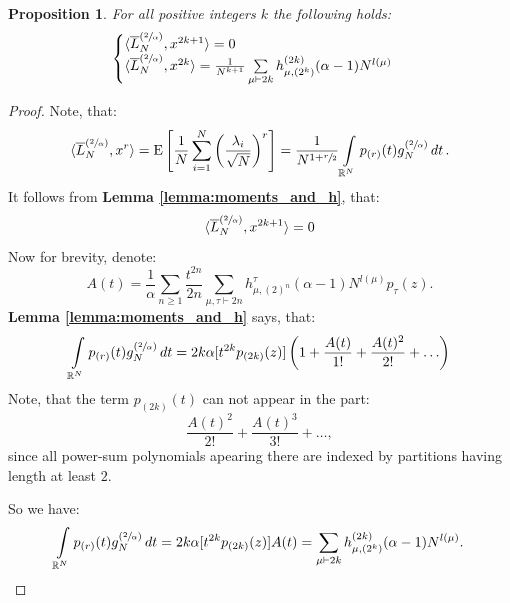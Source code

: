 \documentclass{article}
\newtheorem{proposition}{Proposition}
\newcommand{\E}{\mathrm{E}}
\begin{document}
\begin{proposition}\label{prop:moments_and_h}
    For all positive integers $k$ the following holds:
    \begin{equation}
        \begin{cases}
        \langle \overline{L}_{N}^{(\sfrac{2}{\alpha})}, x^{2k + 1} \rangle = 0 \\
        \langle \overline{L}_{N}^{(\sfrac{2}{\alpha})}, x^{2k} \rangle = \frac{1}{N^{k + 1}}\sum\limits_{\mu \vdash 2k}h_{\mu, (2^k)}^{(2k)}(\alpha - 1)N^{l(\mu)}
        \end{cases}
    \end{equation}
\end{proposition}
\begin{proof}
    Note, that:
    $$
        \langle \overline{L}_{N}^{(\sfrac{2}{\alpha})}, x^{r} \rangle = \E\left[\frac{1}{N}\sum\limits_{i = 1}^N\left(\frac{\lambda_i}{\sqrt{N}}\right)^r\right] = \frac{1}{N^{1 + \sfrac{r}{2}}}\int\limits_{\mathbb{R}^N}p_{(r)}(t)g_N^{(\sfrac{2}{\alpha})}\mathop{dt}.
    $$
    It follows from \textbf{Lemma \ref{lemma:moments_and_h}}, that:
    $$
        \langle \overline{L}_{N}^{(\sfrac{2}{\alpha})}, x^{2k + 1} \rangle = 0
    $$
    Now for brevity, denote:
    $$
        A(t) = \frac{1}{\alpha}\sum\limits_{n \geq 1}\frac{t^{2n}}{2n}\sum\limits_{\mu, \tau \vdash 2n}h_{\mu, (2)^n}^{\tau}(\alpha - 1)N^{l(\mu)}p_{\tau}(z).
    $$
    \textbf{Lemma \ref{lemma:moments_and_h}} says, that:
    $$
        \int\limits_{\mathbb{R}^N}p_{(r)}(t)g_N^{(\sfrac{2}{\alpha})}\mathop{dt} = 2k\alpha[t^{2k}p_{(2k)}(z)]\left(1 + \frac{A(t)}{1!} + \frac{A(t)^2}{2!} + \ldots \right)
    $$
    Note, that the term $p_{(2k)}(t)$ can not appear in the part:
    $$
        \frac{A(t)^2}{2!} + \frac{A(t)^3}{3!} + \ldots , 
    $$
    since all power-sum polynomials apearing there are indexed by partitions having length at least $2$.
    
    So we have:
    \begin{equation}\label{eq:mixed_moments_and_h}
        \int\limits_{\mathbb{R}^N}p_{(r)}(t)g_N^{(\sfrac{2}{\alpha})}\mathop{dt} = 2k\alpha[t^{2k}p_{(2k)}(z)]A(t) = \sum\limits_{\mu \vdash 2k}h_{\mu, (2^k)}^{(2k)}(\alpha - 1)N^{l(\mu)}.
    \end{equation}
\end{proof}
\end{document}
